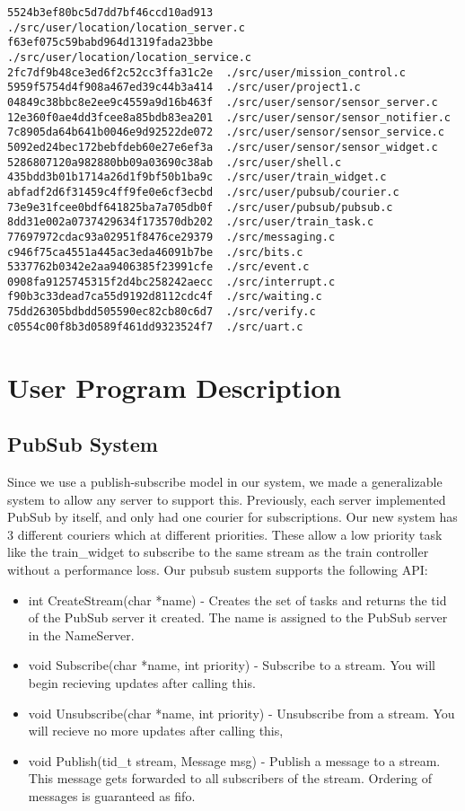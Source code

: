 \documentclass{article}
\begin{document}
\begin{verbatim}
5524b3ef80bc5d7dd7bf46ccd10ad913  ./src/user/location/location_server.c
f63ef075c59babd964d1319fada23bbe  ./src/user/location/location_service.c
2fc7df9b48ce3ed6f2c52cc3ffa31c2e  ./src/user/mission_control.c
5959f5754d4f908a467ed39c44b3a414  ./src/user/project1.c
04849c38bbc8e2ee9c4559a9d16b463f  ./src/user/sensor/sensor_server.c
12e360f0ae4dd3fcee8a85bdb83ea201  ./src/user/sensor/sensor_notifier.c
7c8905da64b641b0046e9d92522de072  ./src/user/sensor/sensor_service.c
5092ed24bec172bebfdeb60e27e6ef3a  ./src/user/sensor/sensor_widget.c
5286807120a982880bb09a03690c38ab  ./src/user/shell.c
435bdd3b01b1714a26d1f9bf50b1ba9c  ./src/user/train_widget.c
abfadf2d6f31459c4ff9fe0e6cf3ecbd  ./src/user/pubsub/courier.c
73e9e31fcee0bdf641825ba7a705db0f  ./src/user/pubsub/pubsub.c
8dd31e002a0737429634f173570db202  ./src/user/train_task.c
77697972cdac93a02951f8476ce29379  ./src/messaging.c
c946f75ca4551a445ac3eda46091b7be  ./src/bits.c
5337762b0342e2aa9406385f23991cfe  ./src/event.c
0908fa9125745315f2d4bc258242aecc  ./src/interrupt.c
f90b3c33dead7ca55d9192d8112cdc4f  ./src/waiting.c
75dd26305bdbdd505590ec82cb80c6d7  ./src/verify.c
c0554c00f8b3d0589f461dd9323524f7  ./src/uart.c
\end{verbatim}

\section{User Program Description}

\subsection{PubSub System}

Since we use a publish-subscribe model in our system, we made a generalizable system to allow any server to support this. Previously, each server implemented PubSub by itself, and only had one courier for subscriptions. Our new system has 3 different couriers which at different priorities. These allow a low priority task like the train\_widget to subscribe to the same stream as the train controller without a performance loss. Our pubsub sustem supports the following API:

\begin{itemize}
  \item int CreateStream(char *name) - Creates the set of tasks and returns the tid of the PubSub server it created. The name is assigned to the PubSub server in the NameServer.
  \item void Subscribe(char *name, int priority) - Subscribe to a stream. You will begin recieving updates after calling this.
  \item void Unsubscribe(char *name, int priority) - Unsubscribe from a stream. You will recieve no more updates after calling this,
  \item void Publish(tid\_t stream, Message msg) - Publish a message to a stream. This message gets forwarded to all subscribers of the stream. Ordering of messages is guaranteed as fifo.
\end{itemize}
\end{document}

